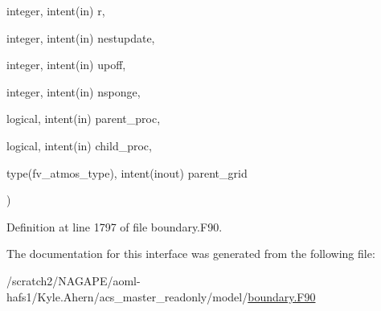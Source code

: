 {\begin{DoxyParamCaption}
\item[{integer, intent(in)}]{r, }
\item[{integer, intent(in)}]{nestupdate, }
\item[{integer, intent(in)}]{upoff, }
\item[{integer, intent(in)}]{nsponge, }
\item[{logical, intent(in)}]{parent\-\_\-proc, }
\item[{logical, intent(in)}]{child\-\_\-proc, }
\item[{type(fv\-\_\-atmos\-\_\-type), intent(inout)}]{parent\-\_\-grid}
\end{DoxyParamCaption}
)}\label{interfaceboundary__mod_1_1update__coarse__grid_a5a1f8f85dffe389683e8a41333195114}


Definition at line 1797 of file boundary.\-F90.



The documentation for this interface was generated from the following file\-:\begin{DoxyCompactItemize}
\item 
/scratch2/\-N\-A\-G\-A\-P\-E/aoml-\/hafs1/\-Kyle.\-Ahern/acs\-\_\-master\-\_\-readonly/model/\hyperlink{boundary_8F90}{boundary.\-F90}\end{DoxyCompactItemize}
